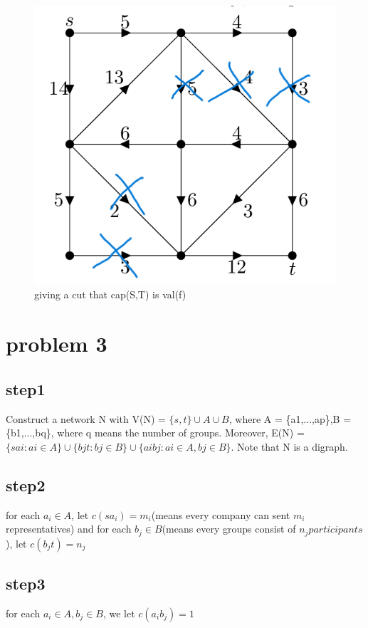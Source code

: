 \documentclass{article}
\begin{document}
\begin{CJK*}{UTF8}{bkai}
\begin{figure}[H]
    \centering
    \includegraphics[scale = 0.3]{hw10cut.png}
    \caption{giving a cut that cap(S,T) is val(f)}
\end{figure}

\section*{problem 3}
\subsection*{step1}
 Construct a network N with V(N) = $\{s,t\}\cup  A \cup B$, where A = \{a1,...,ap\},B = \{b1,...,bq\}, where q means the number of groups.
 Moreover, E(N) = $\{sai : ai \in A\} \cup \{bjt : bj \in B\} \cup \{aibj : ai \in A,bj \in B\}$. Note that N is a
 digraph.
\subsection*{step2}
for each $a_{i} \in A$, let $c(sa_{i}) = m_{i}$(means every company can sent $m_{i}$ representatives) and for each $b_{j} \in B$(means every groups consist of $n_{j} participants$), let $c(b_{j}t) = n_{j}$
\subsection*{step3}
for each $a_{i} \in A, b_{j} \in B$, we let $c(a_{i}b_{j}) = 1$

\end{CJK*}
\end{document}
